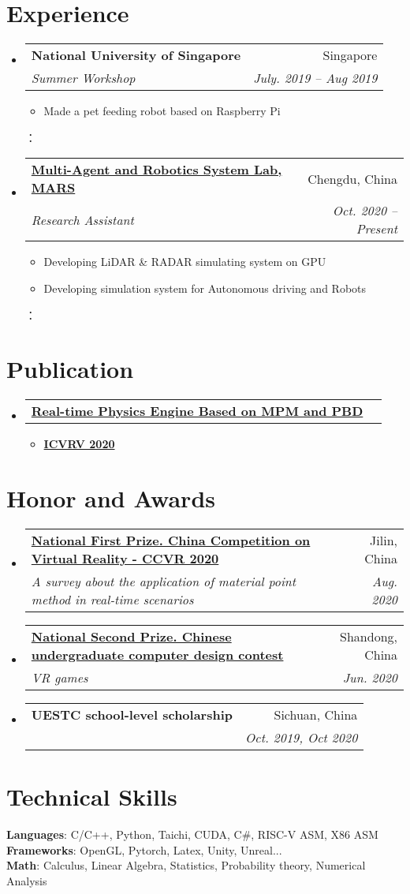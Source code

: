 \documentclass[letterpaper,11pt]{article}
\makeatletter
\newcommand{\resumeItem}[1]{
  \item\small{
    {#1 \vspace{-2pt}}
  }
}
\newcommand{\resumeSubheading}[4]{
  \vspace{-2pt}\item
    \begin{tabular*}{0.97\textwidth}[t]{l@{\extracolsep{\fill}}r}
      \textbf{#1} & #2 \\
      \textit{\small#3} & \textit{\small #4} \\
    \end{tabular*}\vspace{-7pt}
}
\newcommand{\resumeProjectHeading}[2]{
    \item
    \begin{tabular*}{0.97\textwidth}{l@{\extracolsep{\fill}}r}
      \small#1 & #2 \\
    \end{tabular*}\vspace{-7pt}
}
\newcommand{\resumeSubHeadingListStart}{\begin{itemize}[leftmargin=0.15in, label={}]}
\newcommand{\resumeSubHeadingListEnd}{\end{itemize}}
\newcommand{\resumeItemListStart}{\begin{itemize}}
\newcommand{\resumeItemListEnd}{\end{itemize}\vspace{-5pt}}
\makeatother
\begin{document}
\section{Experience}
    \resumeSubHeadingListStart
    \resumeSubheading
      {National University of Singapore}{Singapore }
      {Summer Workshop}{July. 2019 -- Aug 2019}
       \resumeItemListStart
      	\resumeItem{Made a pet feeding robot based on Raspberry Pi}
       \resumeItemListEnd：
        \resumeSubheading
      {\href{http://www.scse.uestc.edu.cn/info/1028/6000.htm}{\textbf{Multi-Agent and Robotics System Lab, MARS}}}{Chengdu, China }
      {Research Assistant}{Oct. 2020 -- Present}
       \resumeItemListStart
        \resumeItem{Developing LiDAR \& RADAR simulating system on GPU}
        \resumeItem{Developing simulation system for Autonomous driving and Robots}
       \resumeItemListEnd：
       
    \resumeSubHeadingListEnd
    
    
\section{Publication}
    \resumeSubHeadingListStart
      \resumeProjectHeading
          {\href{}{\textbf{Real-time Physics Engine Based on MPM and PBD}} }{}
          \resumeItemListStart
            \resumeItem{\href{http://www.icvrv.org/index.html}{\textbf{ICVRV 2020}}}
        \resumeItemListEnd
    \resumeSubHeadingListEnd
    
\section{Honor and Awards}
  \resumeSubHeadingListStart
    \resumeSubheading
      {\href{https://www.chinavr.info/news/show/id/3659.html}{National First Prize. China Competition on Virtual Reality -  CCVR 2020}}{Jilin, China }
      {A survey about the application of material point method in real-time scenarios }{Aug. 2020}
    \resumeSubheading
      {\href{http://jsjds.ruc.edu.cn/UploadFiles/202082817196435.pdf}{National Second Prize. Chinese undergraduate computer design contest}}{Shandong, China }
      {VR games}{Jun. 2020}
     \resumeSubheading
      {UESTC school-level scholarship}{Sichuan, China }
      {}{Oct. 2019, Oct 2020}
 \resumeSubHeadingListEnd

%
\section{Technical Skills}
 \begin{itemize}[leftmargin=0.15in, label={}]
    \small{\item{
     \textbf{Languages}{: C/C++, Python, Taichi, CUDA, C\#, RISC-V ASM, X86 ASM} \\
     \textbf{Frameworks}{: OpenGL, Pytorch, Latex, Unity, Unreal... } \\
     \textbf{Math}{: Calculus, Linear Algebra, Statistics, Probability theory, Numerical Analysis}
    }}
 \end{itemize}


\end{document}
